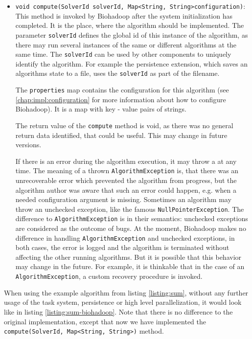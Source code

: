   \begin{itemize}
    \item \texttt{void compute(SolverId solverId, Map<String, String>\newline configuration)}: This method is invoked by Biohadoop after the system initialization has completed. It is the place, where the algorithm should be implemented. The parameter \texttt{solverId} defines the global id of this instance of the algorithm, as there may run several instances of the same or different algorithms at the same time. The \texttt{solverId} can be used by other components to uniquely identify the algorithm. For example the persistence extension, which saves an algorithms state to a file, uses the \texttt{solverId} as part of the filename.
    
    The \texttt{properties} map contains the configuration for this algorithm (see \ref{chap:impl:configuration} for more information about how to configure Biohadoop). It is a map with key - value pairs of strings.
    
    The return value of the \texttt{compute} method is void, as there was no general return data identified, that could be useful. This may change in future versions.
    
    If there is an error during the algorithm execution, it may throw a   at any time. The meaning of a thrown \texttt{AlgorithmException} is, that there was an unrecoverable error which prevented the algorithm from progress, but the algorithm author was aware that such an error could happen, e.g. when a needed configuration argument is missing. Sometimes an algorithm may throw an unchecked exception, like the famous \texttt{NullPointerException}. The difference to \texttt{AlgorithmException} is in their semantics: unchecked exceptions are considered as the outcome of bugs. At the moment, Biohadoop makes no difference in handling \texttt{AlgorithmException} and unchecked exceptions, in both cases, the error is logged and the algorithm is terminated without affecting the other running algorithms. But it is possible that this behavior may change in the future. For example, it is thinkable that in the case of an \texttt{AlgorithmException}, a custom recovery procedure is invoked.
  \end{itemize}
  
  When using the example algorithm from listing \ref{listing:sum}, without any further usage of the task system, persistence or high level parallelization, it would look like in listing \ref{listing:sum-biohadoop}. Note that there is no difference to the original implementation, except that now we have implemented the \texttt{compute(SolverId, Map<String, String>)} method.
  

